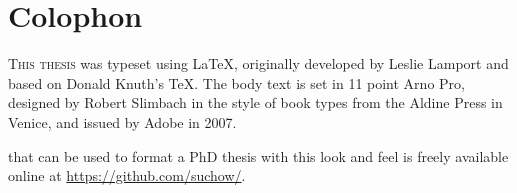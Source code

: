 
\chapter*{Colophon}
\parbox{200pt}{\raggedright\lettrine[lines=3,slope=-2pt,nindent=-4pt]{T}{his thesis} was typeset using \LaTeX, originally developed by Leslie Lamport and based on Donald Knuth's \TeX. The body text is set in 11 point Arno Pro, designed by Robert Slimbach in the style of book types from the Aldine Press in Venice, and issued by Adobe in 2007.

 that can be used to format a PhD thesis with this look and feel is freely available online at \url{https://github.com/suchow/}.

}